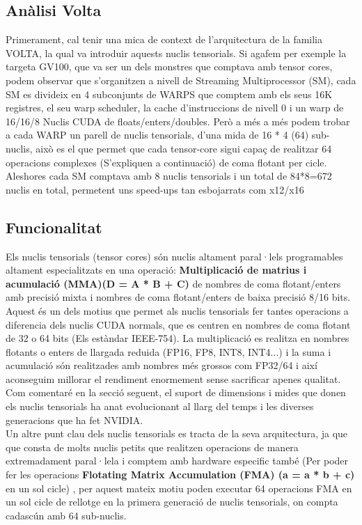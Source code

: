 \documentclass[12pt]{article}
\begin{document}
\subsection{Anàlisi Volta}
Primerament, cal tenir una mica de context de l'arquitectura de la familia VOLTA, la qual va introduir aquests nuclis tensorials. Si agafem per exemple la targeta GV100, que va ser un dels monstres que comptava amb tensor cores, podem observar que s'organitzen a nivell de Streaming Multiprocessor (SM), cada SM es divideix en 4 
subconjunts de WARPS que comptem amb els seus 16K registres, el seu warp scheduler, la cache d'instruccions de nivell 0 i un warp de 16/16/8 Nuclis CUDA de floats/enters/doubles. Però a més a més podem trobar a cada WARP un parell de nuclis tensorials, d'una mida de 16 * 4 (64) sub-nuclis, això es el que permet que cada tensor-core sigui 
capaç de realitzar 64 operacions complexes (S'expliquen a continuació) de coma flotant per cicle. Aleshores cada SM comptava amb 8 nuclis tensorials i  un total de 84*8=672 nuclis en total, permetent uns speed-ups tan esbojarrats com x12/x16

\subsection{Funcionalitat}
Els nuclis tensorials (tensor cores) són nuclis altament paral·lels programables altament especialitzats en una operació: \textbf{Multiplicació de matrius i acumulació (MMA)(D = A * B + C)} de nombres de coma flotant/enters amb precisió mixta i nombres de coma flotant/enters de baixa precisió 8/16 bits. Aquest és un dels motius que permet als nuclis tensorials fer tantes operacions a
diferencia dels nuclis CUDA normals, que es centren en nombres de coma flotant de 32 o 64 bits (Els estàndar IEEE-754). La multiplicació es realitza en nombres flotants o enters de llargada reduida (FP16, FP8, INT8, INT4...) i la suma i acumulació són realitzades amb nombres més grossos com FP32/64 i així aconseguim millorar el rendiment enormement sense sacrificar apenes qualitat. 
Com comentaré en la secció seguent, el suport de dimensions i mides que donen els nuclis tensorials ha anat evolucionant al llarg del temps i les diverses generacions que ha fet NVIDIA.
\\

Un altre punt clau dels nuclis tensorials es tracta de la seva arquitectura, ja que que consta de molts nuclis petits que realitzen operacions de manera extremadament paral·lela i comptem amb hardware especific també (Per poder fer les operacions \textbf{Flotating Matrix Accumulation (FMA) (a = a * b + c) } en un sol cicle) , per aquest mateix motiu poden executar 64 operacions FMA 
en un sol cicle de rellotge en la primera generació de nuclis tensorials, on compta cadascún amb 64 sub-nuclis.
\end{document}
